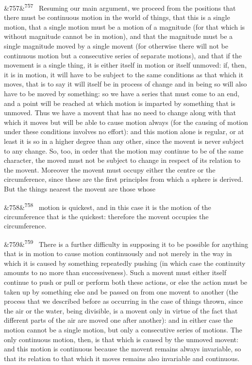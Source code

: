 \documentclass[12pt]{article}
\newcommand{\para}[1][]{\par\noindent\ifx&#1&\else\textsuperscript{\footnotesize #1}~\fi}
\begin{document}
\para[757] Resuming our main argument, we proceed from the positions that there must be continuous motion in the world of things, that this is a single motion, that a single motion must be a motion of a magnitude (for that which is without magnitude cannot be in motion), and that the magnitude must be a single magnitude moved by a single movent (for otherwise there will not be continuous motion but a consecutive series of separate motions), and that if the movement is a single thing, it is either itself in motion or itself unmoved: if, then, it is in motion, it will have to be subject to the same conditions as that which it moves, that is to say it will itself be in process of change and in being so will also have to be moved by something: so we have a series that must come to an end, and a point will be reached at which motion is imparted by something that is unmoved. Thus we have a movent that has no need to change along with that which it moves but will be able to cause motion always (for the causing of motion under these conditions involves no effort): and this motion alone is regular, or at least it is so in a higher degree than any other, since the movent is never subject to any change. So, too, in order that the motion may continue to be of the same character, the moved must not be subject to change in respect of its relation to the movent. Moreover the movent must occupy either the centre or the circumference, since these are the first principles from which a sphere is derived. But the things nearest the movent are those whose

\para[758] motion is quickest, and in this case it is the motion of the circumference that is the quickest: therefore the movent occupies the circumference.

\para[759] There is a further difficulty in supposing it to be possible for anything that is in motion to cause motion continuously and not merely in the way in which it is caused by something repeatedly pushing (in which case the continuity amounts to no more than successiveness). Such a movent must either itself continue to push or pull or perform both these actions, or else the action must be taken up by something else and be passed on from one movent to another (the process that we described before as occurring in the case of things thrown, since the air or the water, being divisible, is a movent only in virtue of the fact that different parts of the air are moved one after another): and in either case the motion cannot be a single motion, but only a consecutive series of motions. The only continuous motion, then, is that which is caused by the unmoved movent: and this motion is continuous because the movent remains always invariable, so that its relation to that which it moves remains also invariable and continuous.
\end{document}

